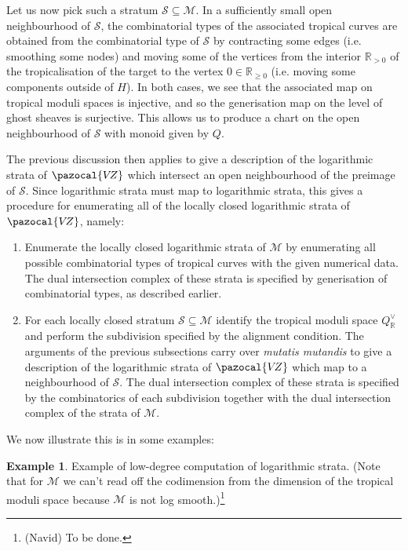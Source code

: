 \documentclass[11pt]{amsart}
\newcommand{\VZ}{\pazocal{V\!Z}}
\newcommand{\Scal}{\mathcal{S}}
\newcommand{\Mcal}{\mathcal{M}}
\newcommand{\RR}{\mathbb{R}}
\theoremstyle{definition}
\theoremstyle{definition}
\newtheorem{example}[thm]{Example}
\begin{document}
Let us now pick such a stratum $\Scal \subseteq \Mcal$. In a sufficiently small open neighbourhood of $\Scal$, the combinatorial types of the associated tropical curves are obtained from the combinatorial type of $\Scal$ by contracting some edges (i.e. smoothing some nodes) and moving some of the vertices from the interior $\RR_{>0}$ of the tropicalisation of the target to the vertex $0 \in \RR_{\geq 0}$ (i.e. moving some components outside of $H$). In both cases, we see that the associated map on tropical moduli spaces is injective, and so the generisation map on the level of ghost sheaves is surjective. This allows us to produce a chart on the open neighbourhood of $\Scal$ with monoid given by $Q$.

The previous discussion then applies to give a description of the logarithmic strata of $\VZ$ which intersect an open neighbourhood of the preimage of $\Scal$. Since logarithmic strata must map to logarithmic strata, this gives a procedure for enumerating all of the locally closed logarithmic strata of $\VZ$, namely:\medskip
\begin{enumerate}[label=\textbf{Step \arabic*:},leftmargin=5\parindent]
\item Enumerate the locally closed logarithmic strata of $\Mcal$ by enumerating all possible combinatorial types of tropical curves with the given numerical data. The dual intersection complex of these strata is specified by generisation of combinatorial types, as described earlier.\medskip
\item For each locally closed stratum $\Scal\subseteq \Mcal$ identify the tropical moduli space $Q^\vee_{\RR}$ and perform the subdivision  specified by the alignment condition. The arguments of the previous subsections carry over \emph{mutatis mutandis} to give a description of the logarithmic strata of $\VZ$ which map to a neighbourhood of $\Scal$. The dual intersection complex of these strata is specified by the combinatorics of each subdivision together with the dual intersection complex of the strata of $\Mcal$.
\end{enumerate}

We now illustrate this is in some examples:
\begin{example} Example of low-degree computation of logarithmic strata. (Note that for $\Mcal$ we can't read off the codimension from the dimension of the tropical moduli space because $\Mcal$ is not log smooth.)\footnote{(Navid) To be done.}\end{example}
\end{document}
